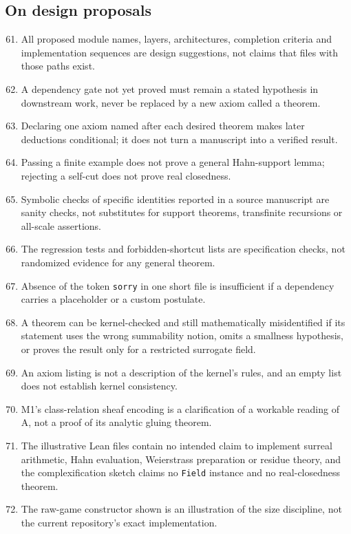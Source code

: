 \documentclass[11pt,letterpaper]{article}
\numberwithin{equation}{section}
\theoremstyle{definition}
\theoremstyle{remark}
\begin{document}
\subsection{On design proposals}
\label{found:app:limdesign}
\begin{enumerate}\setcounter{enumi}{60}
\item All proposed module names, layers, architectures, completion criteria and
implementation sequences are design suggestions, not claims that files with those
paths exist.
\item A dependency gate not yet proved must remain a stated hypothesis in
downstream work, never be replaced by a new axiom called a theorem.
\item Declaring one axiom named after each desired theorem makes later
deductions conditional; it does not turn a manuscript into a verified result.
\item Passing a finite example does not prove a general Hahn-support lemma;
rejecting a self-cut does not prove real closedness.
\item Symbolic checks of specific identities reported in a source manuscript are
sanity checks, not substitutes for support theorems, transfinite recursions or
all-scale assertions.
\item The regression tests and forbidden-shortcut lists are specification
checks, not randomized evidence for any general theorem.
\item Absence of the token \texttt{sorry} in one short file is insufficient if a
dependency carries a placeholder or a custom postulate.
\item A theorem can be kernel-checked and still mathematically misidentified if
its statement uses the wrong summability notion, omits a smallness hypothesis, or
proves the result only for a restricted surrogate field.
\item An axiom listing is not a description of the kernel's rules, and an empty
list does not establish kernel consistency.
\item M1's class-relation sheaf encoding is a clarification of a workable
reading of A, not a proof of its analytic gluing theorem.
\item The illustrative Lean files contain no intended claim to implement surreal
arithmetic, Hahn evaluation, Weierstrass preparation or residue theory, and the
complexification sketch claims no \texttt{Field} instance and no real-closedness
theorem.
\item The raw-game constructor shown is an illustration of the size discipline,
not the current repository's exact implementation.
\end{enumerate}
\end{document}
